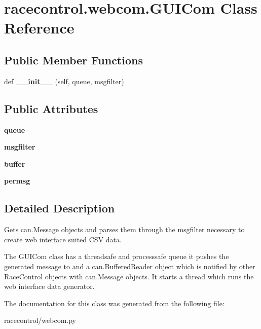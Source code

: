\hypertarget{classracecontrol_1_1webcom_1_1GUICom}{}\section{racecontrol.\+webcom.\+G\+U\+I\+Com Class Reference}
\label{classracecontrol_1_1webcom_1_1GUICom}
\subsection*{Public Member Functions}
\begin{DoxyCompactItemize}
\item 
def {\bfseries \+\_\+\+\_\+init\+\_\+\+\_\+} (self, queue, msgfilter)\hypertarget{classracecontrol_1_1webcom_1_1GUICom_a06515a6004ff7f8554ea65483de9e684}{}\label{classracecontrol_1_1webcom_1_1GUICom_a06515a6004ff7f8554ea65483de9e684}

\end{DoxyCompactItemize}
\subsection*{Public Attributes}
\begin{DoxyCompactItemize}
\item 
{\bfseries queue}\hypertarget{classracecontrol_1_1webcom_1_1GUICom_aaee4be625caecf5e88a86c69b9672e8a}{}\label{classracecontrol_1_1webcom_1_1GUICom_aaee4be625caecf5e88a86c69b9672e8a}

\item 
{\bfseries msgfilter}\hypertarget{classracecontrol_1_1webcom_1_1GUICom_a9a7fb7d0154519fb4b4f9c50f206cb9c}{}\label{classracecontrol_1_1webcom_1_1GUICom_a9a7fb7d0154519fb4b4f9c50f206cb9c}

\item 
{\bfseries buffer}\hypertarget{classracecontrol_1_1webcom_1_1GUICom_a5cef744c84d93e37ef0d6726df5b7595}{}\label{classracecontrol_1_1webcom_1_1GUICom_a5cef744c84d93e37ef0d6726df5b7595}

\item 
{\bfseries permsg}\hypertarget{classracecontrol_1_1webcom_1_1GUICom_a1e1dadd40a811d3f91290cf827f92ec9}{}\label{classracecontrol_1_1webcom_1_1GUICom_a1e1dadd40a811d3f91290cf827f92ec9}

\end{DoxyCompactItemize}


\subsection{Detailed Description}
\begin{DoxyVerb}Gets can.Message objects and parses them through the msgfilter necessary
to create web interface suited CSV data.

The GUICom class has a threadsafe and processsafe queue it pushes the
generated message to and a can.BufferedReader object which is notified by
other RaceControl objects with can.Message objects. It starts a thread
which runs the web interface data generator.
\end{DoxyVerb}
 

The documentation for this class was generated from the following file\+:\begin{DoxyCompactItemize}
\item 
racecontrol/webcom.\+py\end{DoxyCompactItemize}
